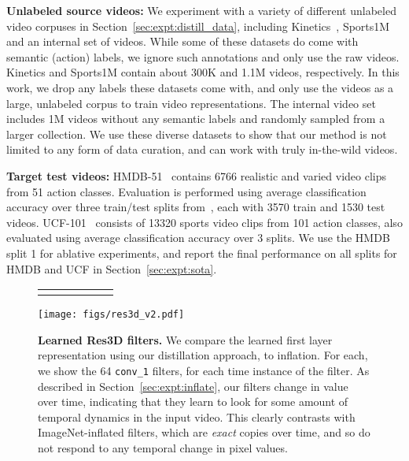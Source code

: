 \documentclass[10pt,twocolumn,letterpaper]{article}
\begin{document}
{\noindent \bf Unlabeled source videos:} We experiment with a variety of different unlabeled video corpuses in Section~\ref{sec:expt:distill_data}, including Kinetics~\cite{kay2017kinetics}, Sports1M~\cite{Karpathy_14} 
and an internal set of videos.
While some of these datasets do come with semantic (action) labels, we ignore such annotations and only use the raw videos.
Kinetics
and Sports1M contain about 300K
and 1.1M videos, respectively.
In this work, we drop any labels these datasets come with, and only use the videos as a large, unlabeled corpus to train video representations.
The internal video set includes 1M videos without any semantic labels and randomly sampled from a larger collection. We use these diverse datasets to show that our method is not limited to any form of data curation, and can work with truly in-the-wild videos.

{\noindent \bf Target test videos:} HMDB-51~\cite{hmdb51} contains 6766 realistic and varied video clips from 51 action classes. Evaluation is
performed using average classification accuracy over three train/test splits from~\cite{THUMOS13}, each with 3570
train and 1530 test videos. UCF-101~\cite{ucf101} consists of 13320 sports video clips from 101 action classes,
also evaluated using average classification accuracy over 3 splits. We use the HMDB split 1 for ablative experiments, and report the final
performance on all splits for HMDB and UCF in Section~\ref{sec:expt:sota}. 


\begin{figure*}[t]
    \centering
    \begin{tabularx}{\linewidth}{YYY@{\hskip 1cm}YYY}
     &  &  &  &  & 
    \end{tabularx}
    \texttt{[image: figs/res3d\_v2.pdf]}
    \caption{
    {\bf Learned Res3D filters.}
    We compare the learned first layer representation using our distillation approach, to inflation.
    For each, we show the 64 \texttt{conv\_1} filters, for each time instance of the filter.
    As described in Section~\ref{sec:expt:inflate}, our filters change in value over time, indicating that they learn to look for some amount of temporal dynamics in the input video. This clearly contrasts with ImageNet-inflated filters, which are {\em exact} copies over time, and so do not respond to any temporal change in pixel values.
    }
    \label{fig:filters_res3d}
\end{figure*}
\end{document}
